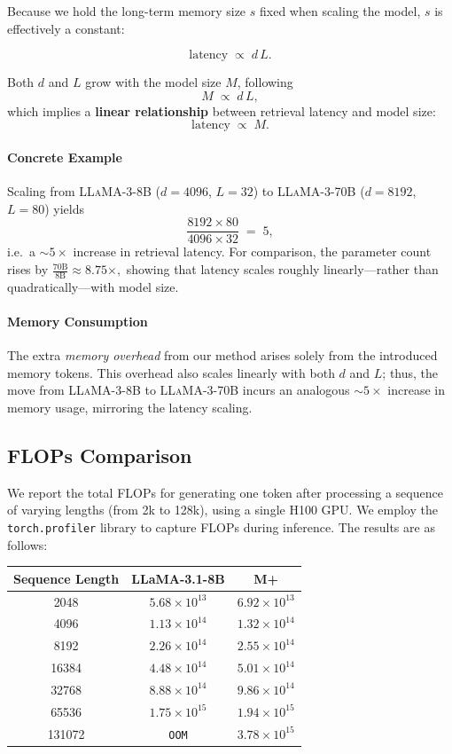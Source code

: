 Because we hold the long-term memory size $s$ fixed when scaling the model, $s$ is effectively a constant:

\[
\text{latency} \;\propto\; d \, L.
\]

Both $d$ and $L$ grow with the model size $M$, following
\[
M \;\propto\; d \, L,
\]
which implies a \textbf{linear relationship} between retrieval latency and model size:
\[
\text{latency} \;\propto\; M.
\]

\paragraph{Concrete Example} Scaling from \textsc{LLaMA-3-8B} ($d=4096$, $L=32$) to \textsc{LLaMA-3-70B} ($d=8192$, $L=80$) yields
\[
\frac{8192 \times 80}{4096 \times 32} \;=\; 5,
\]
i.e.\ a $\sim\!5\times$ increase in retrieval latency.  
For comparison, the parameter count rises by
\(
\frac{70\text{B}}{8\text{B}} \approx 8.75\times,
\)
showing that latency scales roughly linearly—rather than quadratically—with model size.

\paragraph{Memory Consumption} The extra \emph{memory overhead} from our method arises solely from the introduced memory tokens.  
This overhead also scales linearly with both $d$ and $L$; thus, the move from \textsc{LLaMA-3-8B} to \textsc{LLaMA-3-70B} incurs an analogous $\sim\!5\times$ increase in memory usage, mirroring the latency scaling.


\subsection{FLOPs Comparison}
\label{sub:flops_comparison}
We report the total FLOPs for generating one token after processing a sequence of varying lengths (from 2k to 128k), using a single H100 GPU. We employ the \texttt{torch.profiler} library to capture FLOPs during inference. The results are as follows:

\begin{center}
\begin{tabular}{c|cc}
\toprule
\textbf{Sequence Length} & \textbf{LLaMA-3.1-8B} & \textbf{M+} \\
\midrule
2048    & $5.68 \times 10^{13}$ & $6.92 \times 10^{13}$ \\
4096    & $1.13 \times 10^{14}$ & $1.32 \times 10^{14}$ \\
8192    & $2.26 \times 10^{14}$ & $2.55 \times 10^{14}$ \\
16384   & $4.48 \times 10^{14}$ & $5.01 \times 10^{14}$ \\
32768   & $8.88 \times 10^{14}$ & $9.86 \times 10^{14}$ \\
65536   & $1.75 \times 10^{15}$ & $1.94 \times 10^{15}$ \\
131072  & \texttt{OOM}          & $3.78 \times 10^{15}$ \\
\bottomrule
\end{tabular}
\end{center}

